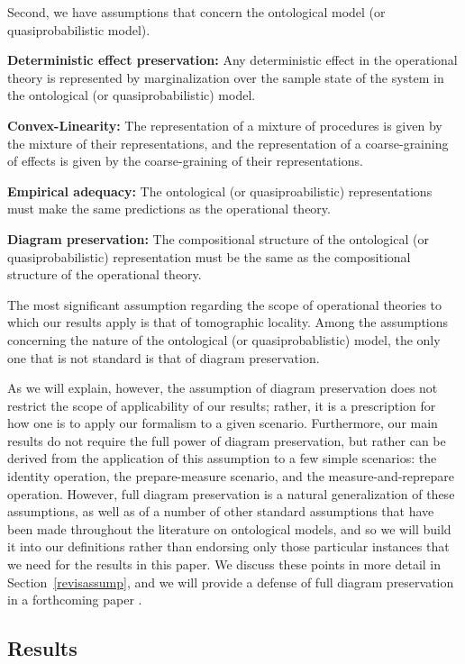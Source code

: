 \documentclass[onecolum,aps,groupedaddress,nofootinbib]{revtex4-2}
\begin{document}
Second, we have assumptions that concern the ontological model (or quasiprobabilistic model).
\ben
\item {\bf Deterministic effect preservation:} Any deterministic effect in the operational theory is represented by marginalization over the  sample 
 state of the system in the ontological (or quasiprobabilistic) model.
\item {\bf Convex-Linearity:} The representation of a mixture of procedures is given by the mixture of their representations, and the representation of a coarse-graining of effects is given by the coarse-graining of their representations.
\item {\bf Empirical adequacy:} The ontological (or quasiproabilistic) representations must make the same predictions as the operational theory.
\item {\bf Diagram preservation:} The compositional structure of the ontological (or quasiprobabilistic) representation must be the same as the compositional structure of the operational theory.
\een

The most significant assumption regarding the scope of operational theories to which our results apply is that of tomographic locality.   Among the assumptions concerning the nature of the ontological (or quasiprobablistic) model, the only one that is not standard is that of diagram preservation.

As we will explain,
however, the assumption of
diagram preservation does not restrict the scope of applicability of our results; rather, it is a prescription for how one is to apply our formalism to a given scenario.
Furthermore, our main results do not require the full power of diagram preservation, but rather can be derived from the application of this assumption to a few simple scenarios: the identity operation, the prepare-measure scenario, and the measure-and-reprepare operation.
However, full diagram preservation is a natural generalization of these assumptions, as well as of a number of other standard assumptions that have been made throughout the literature on ontological models, and so we will build it into our definitions rather than endorsing only those particular instances that we need for the results in this paper.
We discuss these points in more detail in Section~\ref{revisassump}, and we will provide a defense of full diagram preservation in a forthcoming paper \cite{schmid2020unscrambling}.



\subsection{Results}
\end{document}
